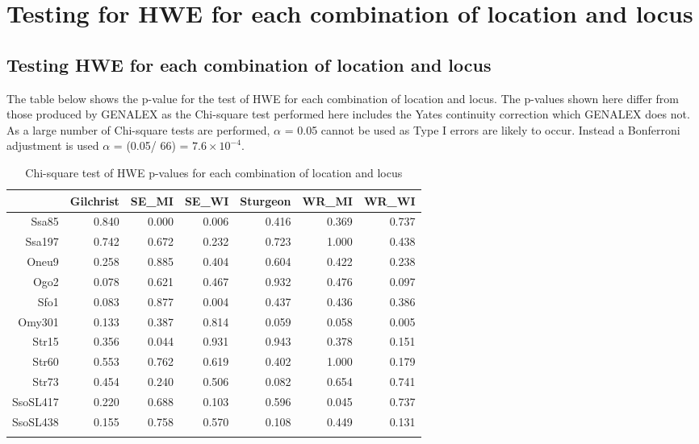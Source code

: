\documentclass[a4paper]{scrartcl}\usepackage[]{graphicx}\usepackage[]{color}
\begin{document}
\FloatBarrier

\section{Testing for HWE for each combination of location and locus}


\subsection{Testing HWE for each combination of location and locus}



\noindent
The table below shows the p-value for the test of HWE for each combination of location and locus. The p-values shown here differ from those produced by GENALEX as the Chi-square test performed here includes the Yates continuity correction which GENALEX does not. As a large number of Chi-square tests are performed, $\alpha$ = 0.05  cannot be used as Type I errors are likely to occur. Instead a Bonferroni adjustment is used $\alpha$ = (0.05/ 66) = \ensuremath{7.6\times 10^{-4}}.

\begin{table}[ht]
\centering
\begin{tabular}{rrrrrrr}
  \hline
 & Gilchrist & SE\_MI & SE\_WI & Sturgeon & WR\_MI & WR\_WI \\ 
  \hline
Ssa85 & 0.840 & 0.000 & 0.006 & 0.416 & 0.369 & 0.737 \\ 
   \rowcolor[gray]{0.9} Ssa197 & 0.742 & 0.672 & 0.232 & 0.723 & 1.000 & 0.438 \\ 
  Oneu9 & 0.258 & 0.885 & 0.404 & 0.604 & 0.422 & 0.238 \\ 
   \rowcolor[gray]{0.9} Ogo2 & 0.078 & 0.621 & 0.467 & 0.932 & 0.476 & 0.097 \\ 
  Sfo1 & 0.083 & 0.877 & 0.004 & 0.437 & 0.436 & 0.386 \\ 
   \rowcolor[gray]{0.9} Omy301 & 0.133 & 0.387 & 0.814 & 0.059 & 0.058 & 0.005 \\ 
  Str15 & 0.356 & 0.044 & 0.931 & 0.943 & 0.378 & 0.151 \\ 
   \rowcolor[gray]{0.9} Str60 & 0.553 & 0.762 & 0.619 & 0.402 & 1.000 & 0.179 \\ 
  Str73 & 0.454 & 0.240 & 0.506 & 0.082 & 0.654 & 0.741 \\ 
   \rowcolor[gray]{0.9} SsoSL417 & 0.220 & 0.688 & 0.103 & 0.596 & 0.045 & 0.737 \\ 
  SsoSL438 & 0.155 & 0.758 & 0.570 & 0.108 & 0.449 & 0.131 \\ 
   \rowcolor[gray]{0.9}  \hline
\end{tabular}
\caption{Chi-square test of HWE p-values for each combination of location and locus} 
\end{table}
\end{document}
